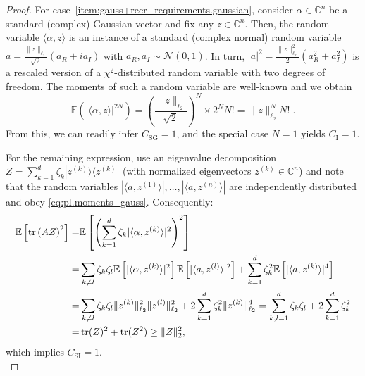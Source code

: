 \begin{proof}
  For case~\ref{item:gauss+recr_requirements.gaussian}, consider $\alpha \in \mathbb{C}^n$ be a standard (complex) Gaussian vector and fix any $ z \in \mathbb{C}^n$.
  Then, the random variable $\langle \alpha, z \rangle$ is an instance of a standard (complex normal) random variable $a = \tfrac{\|  z \|_{\ell_2}}{\sqrt{2}} \left(a_R + i a_I\right)$ with $a_R, a_I \sim \mathcal{N}(0,1)$.
  In turn, $|a|^2 = \frac{\|  z \|_{\ell_2}^2}{2} (a_R^2 + a_I^2)$ is a rescaled version of a $\chi^2$-distributed random variable with two degrees of freedom.
  The moments of such a random variable are well-known and we obtain
  \[
    \mathbb{E} (| \langle \alpha, z \rangle|^{2N})= \left( \frac{ \|  z \|_{\ell_2}}{\sqrt{2}}\right)^N \times 2^N N! = \|  z \|_{\ell_2}^N N! \; .\label{eq:pl.moments_gauss}
  \]
  From this, we can readily infer $C_\mathrm{SG} = 1$, and the special case $N=1$  yields $C_\mathrm{I}=1$.

  For the remaining expression, use an eigenvalue decomposition $ Z = \sum_{k=1}^d \zeta_k | z^{(k)} \rangle \langle  z^{(k)}|$ (with normalized eigenvectors $ z^{(k)}\in \mathbb{C}^n$) and note that the random variables $|\langle  a, z^{(1)} \rangle|,\ldots, | \langle  a, z^{(n)} \rangle|$ are independently distributed and obey \cref{eq:pl.moments_gauss}.
  Consequently:
  \begin{align}
    \mathbb{E} \left[ \operatorname{tr} \left(  A  Z \right)^2 \right]
    =& \mathbb{E} \left[ \left( \sum_{k=1}^d \zeta_k | \langle \alpha, z^{(k)} \rangle|^2 \right)^2 \right] \\
    =& \sum_{k \neq l} \zeta_k \zeta_l \mathbb{E} \left[ |\langle \alpha, z^{(k)} \rangle|^2 \right] \mathbb{E} \left[ | \langle  a, z^{(l)} \rangle|^2 \right]
    + \sum_{k=1}^d \zeta_k^2 \mathbb{E} \left[ | \langle  a,  z^{(k)} \rangle|^4 \right] \\
    =& \sum_{k \neq l} \zeta_k \zeta_l \| z^{(k)} \|_{\ell_2}^2 \|  z^{(l)} \|_{\ell_2}^2 + 2 \sum_{k=1}^d \zeta_k^2 \|  z^{(k)} \|_{\ell_2}^4
    = \sum_{k,l=1}^d \zeta_k \zeta_l + 2\sum_{k=1}^d \zeta_k^2 \\
    =& \operatorname{tr} ( Z)^2 + \operatorname{tr} ( Z^2)
    \geq \|  Z \|_2^2,
  \end{align}
  which implies $C_\mathrm{SI} = 1$.\\




\end{proof}

